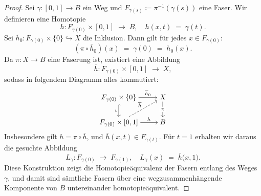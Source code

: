 \documentclass[12pt, hidelinks]{article}
\numberwithin{conj}{section}
\begin{document}
        \begin{proof}
            Sei \(\gamma : [0,1] \to B\) ein Weg und \(F_{\gamma(s)} \coloneqq \pi^{-1}(\gamma(s))\) eine Faser. Wir definieren eine Homotopie
            \[
                h : F_{\gamma(0)} \times [0,1] \;\longrightarrow\; B,
                \quad
                h(x,t) \;=\; \gamma(t).
            \]
            Sei \(\overline{h}_0 : F_{\gamma(0)} \times \{0\} \hookrightarrow X\) die Inklusion. Dann gilt für jedes \(x \in F_{\gamma(0)}\):
            \[
                (\pi \circ \overline{h}_0)(x) \;=\; \gamma(0)
                \;=\;
                h_0(x).
            \]
            Da \(\pi : X \to B\) eine Faserung ist, existiert eine Abbildung
            \[
                \overline{h} : F_{\gamma(0)} \times [0,1] \;\longrightarrow\; X,
            \]
            sodass in folgendem Diagramm alles kommutiert:
            \[\begin{tikzcd}[cramped]
                {F_{\gamma(0)}\times\{0\}} & X \\
                {F_{\gamma(0)}\times[0,1]} & B
                \arrow["{\overline{h}_0}", from=1-1, to=1-2]
                \arrow["\iota"', hook, from=1-1, to=2-1]
                \arrow["\pi"{description}, from=1-2, to=2-2]
                \arrow["{\overline{h}}", dashed, from=2-1, to=1-2]
                \arrow["h", from=2-1, to=2-2]
                \end{tikzcd}\]
                Insbesondere gilt \(h = \pi \circ \overline{h}\), und \(\overline{h}(x,t) \in F_{\gamma(t)}\). Für \(t=1\) erhalten wir daraus die gesuchte Abbildung
                \[
                    L_\gamma : F_{\gamma(0)} \;\longrightarrow\; F_{\gamma(1)},
                    \quad
                    L_\gamma(x) \;=\; \overline{h}\bigl(x,1\bigr).
                \]
                Diese Konstruktion zeigt die Homotopieäquivalenz der Fasern entlang des Weges \(\gamma\), und damit sind sämtliche Fasern über eine wegzusammenhängende Komponente von \(B\) untereinander homotopieäquivalent.
                \end{proof}
                
\end{document}
